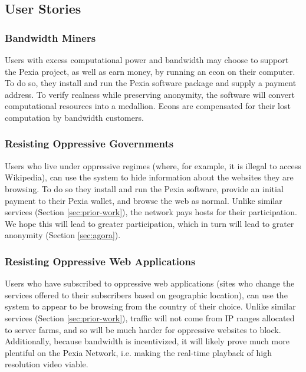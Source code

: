 \documentclass{article}
\newcommand{\mesh}{Pexia}
\begin{document}
\subsection{User Stories}

\subsubsection{Bandwidth Miners}

Users with excess computational power and bandwidth may choose to support the \mesh{} project, as well as earn money, by running an econ on their computer. To do so, they install and run the \mesh{} software package and supply a payment address. To verify realness while preserving anonymity, the software will convert computational resources into a medallion. Econs are compensated for their lost computation by bandwidth customers.

\subsubsection{Resisting Oppressive Governments}

Users who live under oppressive regimes (where, for example, it is illegal to access Wikipedia), can use the system to hide information about the websites they are browsing. To do so they install and run the \mesh{} software, provide an initial payment to their \mesh{} wallet, and browse the web as normal. Unlike similar services (Section \ref{sec:prior-work}), the network pays hosts for their participation. We hope this will lead to greater participation, which in turn will lead to grater anonymity (Section \ref{sec:agora}).

\subsubsection{Resisting Oppressive Web Applications}

Users who have subscribed to oppressive web applications (sites who change the services offered to their subscribers based on geographic location), can use the system to appear to be browsing from the country of their choice. Unlike similar services (Section \ref{sec:prior-work}), traffic will not come from IP ranges allocated to server farms, and so will be much harder for oppressive websites to block. Additionally, because bandwidth is incentivized, it will likely prove much more plentiful on the \mesh{} Network, i.e. making the real-time playback of high resolution video viable.
\end{document}
